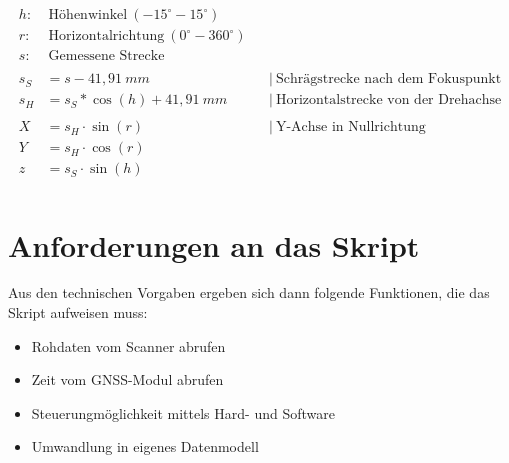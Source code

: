\documentclass[a4paper,12pt,bibliography=totoc, listof=totoc,titlepage,pointlessnumbers]{scrreprt}
\begin{document}
\begin{equation}
\begin{aligned}
h:&~\text{H\"{o}henwinkel}~(-15^\circ - 15^\circ) \\
r:&~\text{Horizontalrichtung}~(0^\circ - 360^\circ) \\
s:&~\text{Gemessene~Strecke} \\
\\
s_S &= s - 41,91~mm    		 && \left|\  \text{Schr\"{a}gstrecke nach dem Fokuspunkt} \right. \\
s_H &= s_S * \cos(h) + 41,91~mm  && \left|\  \text{Horizontalstrecke von der Drehachse} \right. \\
\\
X &= s_H \cdot \sin(r) && \left|\  \text{Y-Achse in Nullrichtung} \right. \\
Y &= s_H \cdot \cos(r) \\
z &= s_S \cdot \sin(h) \\
\end{aligned}
\label{equ:koordinaten}
\end{equation}

\section{Anforderungen an das Skript}
Aus den technischen Vorgaben ergeben sich dann folgende Funktionen, die das Skript aufweisen muss:
\begin{itemize}
 \item Rohdaten vom Scanner abrufen
 \item Zeit vom GNSS-Modul abrufen
 \item Steuerungmöglichkeit mittels Hard- und Software
 \item Umwandlung in eigenes Datenmodell
\end{itemize}
\end{document}
